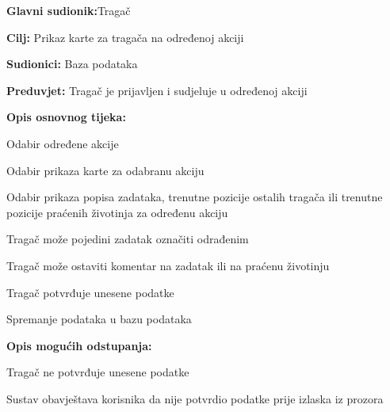 	
			
			
				
				\noindent {}
				\begin{packed_item}
					
					\item \textbf{Glavni sudionik:}Tragač
					\item  \textbf{Cilj:} Prikaz karte za tragača na određenoj akciji
					\item  \textbf{Sudionici:} Baza podataka
					\item  \textbf{Preduvjet:} Tragač je prijavljen i sudjeluje u određenoj akciji
					\item  \textbf{Opis osnovnog tijeka:}
					
					\item[] \begin{packed_enum}
						
						\item Odabir određene akcije
						\item Odabir prikaza karte za odabranu akciju
						\item Odabir prikaza popisa zadataka, trenutne pozicije ostalih tragača ili trenutne pozicije praćenih životinja za određenu akciju
						\item Tragač može pojedini zadatak označiti odrađenim
						\item Tragač može ostaviti komentar na zadatak ili na praćenu životinju
						\item Tragač potvrđuje unesene podatke
						\item Spremanje podataka u bazu podataka
					\end{packed_enum}
					
					\item  \textbf{Opis mogućih odstupanja:}
					
					\item[] \begin{packed_item}
						
						
						\item[5.a] Tragač ne potvrđuje unesene podatke
						\item[] \begin{packed_enum}
							
							\item Sustav obavještava korisnika da nije potvrdio podatke prije izlaska iz prozora
							
						\end{packed_enum}
						
					\end{packed_item}
					
				\end{packed_item}
				
